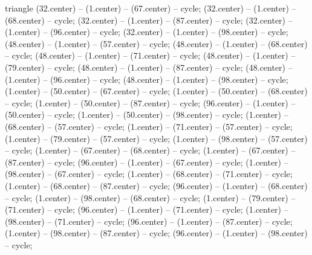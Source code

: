 \begin{pgfonlayer}{triangle}
 (32.center) -- (1.center) -- (67.center) -- cycle; 
 (32.center) -- (1.center) -- (68.center) -- cycle; 
 (32.center) -- (1.center) -- (87.center) -- cycle; 
 (32.center) -- (1.center) -- (96.center) -- cycle; 
 (32.center) -- (1.center) -- (98.center) -- cycle; 
 (48.center) -- (1.center) -- (57.center) -- cycle; 
 (48.center) -- (1.center) -- (68.center) -- cycle; 
 (48.center) -- (1.center) -- (71.center) -- cycle; 
 (48.center) -- (1.center) -- (79.center) -- cycle; 
 (48.center) -- (1.center) -- (87.center) -- cycle; 
 (48.center) -- (1.center) -- (96.center) -- cycle; 
 (48.center) -- (1.center) -- (98.center) -- cycle; 
 (1.center) -- (50.center) -- (67.center) -- cycle; 
 (1.center) -- (50.center) -- (68.center) -- cycle; 
 (1.center) -- (50.center) -- (87.center) -- cycle; 
 (96.center) -- (1.center) -- (50.center) -- cycle; 
 (1.center) -- (50.center) -- (98.center) -- cycle; 
 (1.center) -- (68.center) -- (57.center) -- cycle; 
 (1.center) -- (71.center) -- (57.center) -- cycle; 
 (1.center) -- (79.center) -- (57.center) -- cycle; 
 (1.center) -- (98.center) -- (57.center) -- cycle; 
 (1.center) -- (67.center) -- (68.center) -- cycle; 
 (1.center) -- (67.center) -- (87.center) -- cycle; 
 (96.center) -- (1.center) -- (67.center) -- cycle; 
 (1.center) -- (98.center) -- (67.center) -- cycle; 
 (1.center) -- (68.center) -- (71.center) -- cycle; 
 (1.center) -- (68.center) -- (87.center) -- cycle; 
 (96.center) -- (1.center) -- (68.center) -- cycle; 
 (1.center) -- (98.center) -- (68.center) -- cycle; 
 (1.center) -- (79.center) -- (71.center) -- cycle; 
 (96.center) -- (1.center) -- (71.center) -- cycle; 
 (1.center) -- (98.center) -- (71.center) -- cycle; 
 (96.center) -- (1.center) -- (87.center) -- cycle; 
 (1.center) -- (98.center) -- (87.center) -- cycle; 
 (96.center) -- (1.center) -- (98.center) -- cycle; 

\end{pgfonlayer}
